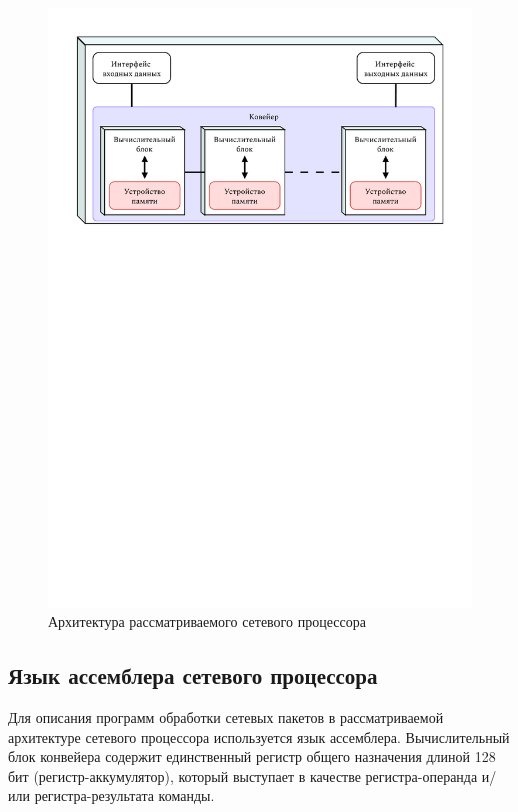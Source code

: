 \documentclass[oneside,final,12pt]{extarticle}
\begin{document}
            \begin{figure}[h]
                \centering
                \includegraphics[trim=0 1000 0 0,clip,width=\textwidth]{npu.pdf}
                \caption{Архитектура рассматриваемого сетевого процессора}
                \label{img:npu_arch}
            \end{figure}
            
        \subsection{Язык ассемблера сетевого процессора}
            \label{sect:asm}
            Для описания программ обработки сетевых пакетов в рассматриваемой архитектуре сетевого процессора используется язык ассемблера.
            Вычислительный блок конвейера содержит единственный регистр общего назначения длиной 128 бит (регистр-аккумулятор), который выступает в качестве регистра-операнда и/или регистра-результата команды.
\end{document}
